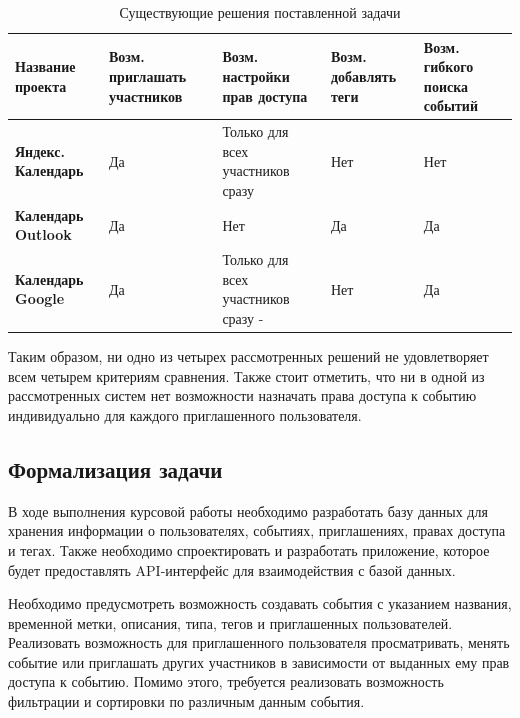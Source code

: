 \begin{table}[ht!]
	\centering
	\caption{Существующие решения поставленной задачи}
	\label{tbl:exist}
	\begin{tabular}{|p{2.6cm}|p{3cm}|p{4cm}|p{3cm}|p{2cm}|}
		\hline
		\textbf{Название проекта}         & \textbf{Возм. приглашать участников} & \textbf{Возм. настройки прав доступа} & \textbf{Возм. добавлять теги} & \textbf{Возм. гибкого поиска событий} \\ \hline
		\textbf{Яндекс. Календарь} \cite{yandex}   &  Да                                   & Только для всех участников сразу                                    & Нет                             &  Нет                                     \\ \hline
		\textbf{Календарь Outlook} \cite{outlook}   & Да                                    & Нет                                      & Да                             & Да                                      \\ \hline
		\textbf{Календарь Google} \cite{google} & Да                                    & Только для всех участников сразу -                                     & Нет                             &   Да                                    \\ \hline
	\end{tabular}
\end{table}

Таким образом, ни одно из четырех рассмотренных решений не удовлетворяет всем четырем критериям сравнения. Также стоит отметить, что ни в одной из рассмотренных систем нет возможности назначать права доступа к событию индивидуально для каждого приглашенного пользователя.

\subsection{Формализация задачи}

В ходе выполнения курсовой работы необходимо разработать базу данных для хранения информации о пользователях, событиях, приглашениях, правах доступа и тегах. Также необходимо спроектировать и разработать приложение, которое будет предоставлять API-интерфейс для взаимодействия с базой данных. 

Необходимо предусмотреть возможность создавать события с указанием названия, временной метки, описания, типа,  тегов и приглашенных пользователей. Реализовать возможность для приглашенного пользователя просматривать, менять событие или приглашать других участников в зависимости от выданных ему прав доступа к событию. Помимо этого, требуется реализовать возможность фильтрации и сортировки по различным данным события.

